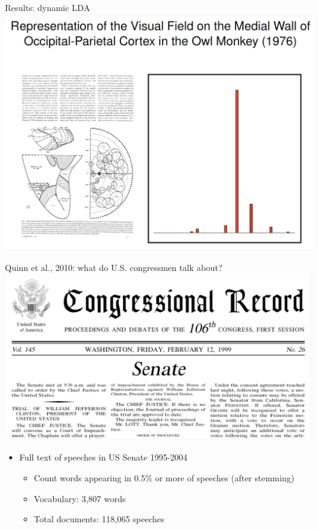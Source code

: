 \documentclass[english]{beamer}
\begin{document}
\begin{frame}{Results: dynamic LDA}
\centering
\includegraphics[width=0.9 \textwidth]{Images/brain_orang2.png} 
\end{frame}

\begin{frame}{Quinn et al., 2010: what do U.S. congressmen talk about?}
\centering
\includegraphics[width=0.8 \textwidth]{Images/congress_records.png} 
\vspace{10pt}
\begin{itemize}
    \item Full text of speeches in US Senate 1995-2004
    \vspace{4pt}
    \begin{itemize}
    \setlength{\itemsep}{0.4em}
     \setlength{\itemindent}{-0.75em}
        \item Count words appearing in 0.5\% or more of speeches (after stemming)
        \item Vocabulary: 3,807 words
        \item Total documents: 118,065 speeches
    \end{itemize}
\end{itemize}
\end{frame}
\end{document}
